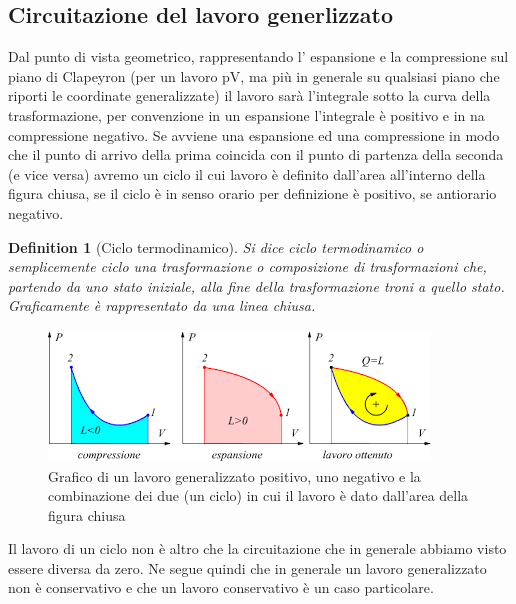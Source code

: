 \documentclass[10pt,a4paper]{article}
\newtheorem{definition}{Definition}
\begin{document}
\subsection{Circuitazione del lavoro generlizzato}
Dal punto di vista geometrico, rappresentando l' espansione e la compressione sul piano di Clapeyron (per un lavoro pV, ma più in generale su qualsiasi piano che riporti le coordinate generalizzate) il lavoro sarà l'integrale sotto la curva della trasformazione, per convenzione in un espansione l'integrale è positivo e in na compressione negativo. Se avviene una espansione ed una compressione in modo che il punto di arrivo della prima coincida con il punto di partenza della seconda (e vice versa) avremo un ciclo il cui lavoro è definito dall'area all'interno della figura chiusa, se il ciclo è in senso orario per definizione è positivo, se antiorario negativo. 
\begin{definition}[Ciclo termodinamico]
	Si dice ciclo termodinamico o semplicemente ciclo una trasformazione o composizione di trasformazioni che, partendo da uno stato iniziale, alla fine della trasformazione troni a quello stato. Graficamente è rappresentato da una linea chiusa. 
\end{definition}
\begin{figure}[h!]
	\centering
	\includegraphics[width=0.6 \linewidth]{../images/ciclo}
	\caption{Grafico di un lavoro generalizzato positivo, uno negativo e la combinazione dei due (un ciclo) in cui il lavoro è dato dall'area della figura chiusa}
	\label{fig:ciclo}
\end{figure}
\FloatBarrier
Il lavoro di un ciclo non è altro che la circuitazione che in generale abbiamo visto essere diversa da zero. Ne segue quindi che in generale un lavoro generalizzato non è conservativo e che un lavoro conservativo è un caso particolare.
\end{document}
